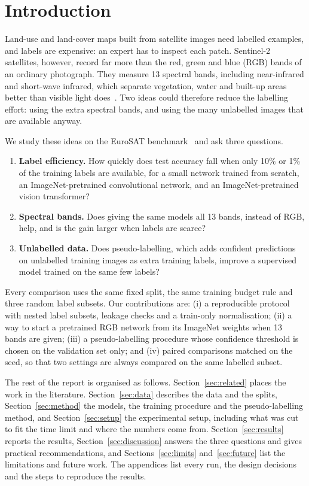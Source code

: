 \documentclass[conference]{IEEEtran}
\begin{document}
\section{Introduction}
Land-use and land-cover maps built from satellite images need labelled examples, and labels are expensive: an expert has to inspect each patch. Sentinel-2 satellites, however, record far more than the red, green and blue (RGB) bands of an ordinary photograph. They measure 13 spectral bands, including near-infrared and short-wave infrared, which separate vegetation, water and built-up areas better than visible light does~\cite{drusch2012sentinel}. Two ideas could therefore reduce the labelling effort: using the extra spectral bands, and using the many unlabelled images that are available anyway.

We study these ideas on the EuroSAT benchmark~\cite{helber2019eurosat} and ask three questions.
\begin{enumerate}
\item \textbf{Label efficiency.} How quickly does test accuracy fall when only 10\% or 1\% of the training labels are available, for a small network trained from scratch, an ImageNet-pretrained convolutional network, and an ImageNet-pretrained vision transformer?
\item \textbf{Spectral bands.} Does giving the same models all 13 bands, instead of RGB, help, and is the gain larger when labels are scarce?
\item \textbf{Unlabelled data.} Does pseudo-labelling, which adds confident predictions on unlabelled training images as extra training labels, improve a supervised model trained on the same few labels?
\end{enumerate}
Every comparison uses the same fixed split, the same training budget rule and three random label subsets. Our contributions are: (i) a reproducible protocol with nested label subsets, leakage checks and a train-only normalisation; (ii) a way to start a pretrained RGB network from its ImageNet weights when 13 bands are given; (iii) a pseudo-labelling procedure whose confidence threshold is chosen on the validation set only; and (iv) paired comparisons matched on the seed, so that two settings are always compared on the same labelled subset.

The rest of the report is organised as follows. Section~\ref{sec:related} places the work in the literature. Section~\ref{sec:data} describes the data and the splits, Section~\ref{sec:method} the models, the training procedure and the pseudo-labelling method, and Section~\ref{sec:setup} the experimental setup, including what was cut to fit the time limit and where the numbers come from. Section~\ref{sec:results} reports the results, Section~\ref{sec:discussion} answers the three questions and gives practical recommendations, and Sections~\ref{sec:limits} and~\ref{sec:future} list the limitations and future work. The appendices list every run, the design decisions and the steps to reproduce the results.
\end{document}
